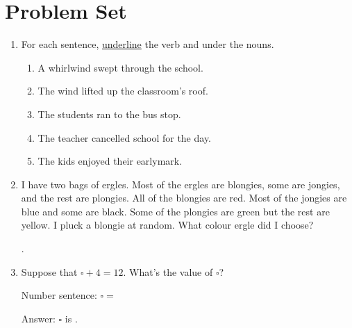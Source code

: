 \documentclass{tufte-book}
\begin{document}
\clearpage\section{Problem Set }

\begin{enumerate}
  \item For each sentence, \underline{underline} the verb and  under the nouns.
  \begin{enumerate}
    \item A whirlwind swept through the school.
    \item The wind lifted up the classroom's roof.
    \item The students ran to the bus stop.
    \item The teacher cancelled school for the day.
    \item The kids enjoyed their earlymark.
  \end{enumerate}

  \item I have two bags of ergles. Most of the ergles are blongies, some are jongies, and the rest are plongies.
  All of the blongies are red. Most of the jongies are blue and some are black.
  Some of the plongies are green but the rest are yellow.
  I pluck a blongie at random. What colour ergle did I choose?\bigskip\par
  \dotfill\bigskip\par\dotfill\bigskip\par\dotfill.

  \item Suppose that $\square + 4 = 12.$ What's the value of $\square$?\bigskip\par
  Number sentence: $\square =$ \dotfill\bigskip\par
  Answer: $\square$ is \dotfill.


\end{enumerate}
\end{document}

